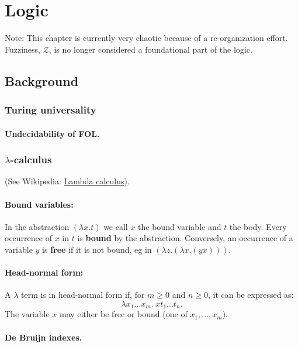 \chapter{Logic}
\minitoc

Note:  This chapter is currently very chaotic because of a re-organization effort.  Fuzziness, $\mathcal{Z}$, is no longer considered a foundational part of the logic.

\section{Background}

\subsection{Turing universality}

\subsubsection{Undecidability of FOL.}

\subsection{$\lambda$-calculus}

(See Wikipedia: \href{http://en.wikipedia.org/wiki/Lambda_calculus}{Lambda calculus}).

\subsubsection{Bound variables:}  In the abstraction $(\lambda x.t)$ we call $x$ the bound variable and $t$ the body.  Every occurrence of $x$ in $t$ is \textbf{bound} by the abstraction.  Conversely, an occurrence of a variable $y$ is \textbf{free} if it is not bound, eg in $(\lambda z.(\lambda x.(yx)))$.

\subsubsection{Head-normal form:}  A $\lambda$ term is in head-normal form if, for $m \geq 0$ and $n \geq 0$, it can be expressed as:
$$\lambda x_1 ... x_m . \; x t_1 ... t_n.$$
The variable $x$ may either be free or bound (one of $x_1,...,x_m$).

\subsubsection{De Bruijn indexes.}

